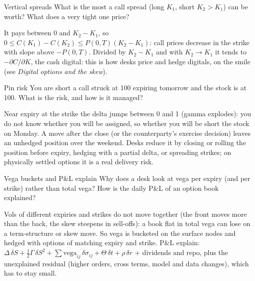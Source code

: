 \begin{question}{\Theory {}}{Vertical spreads}
What is the most a call spread (long $K_1$, short $K_2 > K_1$) can be worth? What does a very tight one price?
\end{question}
\begin{answer}
It pays between 0 and $K_2 - K_1$, so $0 \le C(K_1) - C(K_2) \le P(0,T)(K_2 - K_1)$: call prices decrease in the strike
with slope above $-P(0,T)$. Divided by $K_2 - K_1$ and with $K_2 \to K_1$ it tends to $-\partial C/\partial K$, the
cash digital: this is how desks price and hedge digitals, on the smile (see \emph{Digital options and the skew}).
\end{answer}

\begin{question}{\Theory {}}{Pin risk}
You are short a call struck at 100 expiring tomorrow and the stock is at 100. What is the risk, and how is it managed?
\end{question}
\begin{answer}
Near expiry at the strike the delta jumps between 0 and 1 (gamma explodes): you do not know whether you will be
assigned, so whether you will be short the stock on Monday. A move after the close (or the counterparty's exercise
decision) leaves an unhedged position over the weekend. Desks reduce it by closing or rolling the position before
expiry, hedging with a partial delta, or spreading strikes; on physically settled options it is a real delivery risk.
\end{answer}

\begin{question}{\Theory {}}{Vega buckets and P\&L explain}
Why does a desk look at vega per expiry (and per strike) rather than total vega? How is the daily P\&L of an option
book explained?
\end{question}
\begin{answer}
Vols of different expiries and strikes do not move together (the front moves more than the back, the skew
steepens in sell-offs): a book flat in total vega can lose on a term-structure or skew move. So vega is bucketed on
the surface nodes and hedged with options of matching expiry and strike. P\&L explain: $\Delta\,\delta S + \tfrac12\Gamma\,
\delta S^2 + \sum \text{vega}_{ij}\,\delta\sigma_{ij} + \Theta\,\delta t + \rho\,\delta r$ + dividends and repo, plus
the unexplained residual (higher orders, cross terms, model and data changes), which has to stay small.
\end{answer}

